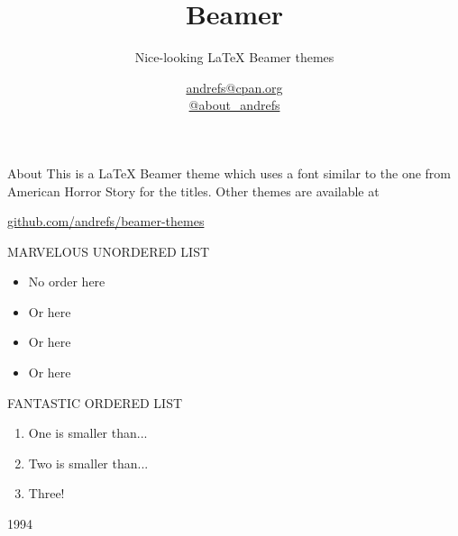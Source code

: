 \documentclass[serif,14pt,color=usenames,dvipsnames]{beamer}
\title{Beamer}
\subtitle{Nice-looking LaTeX Beamer themes}
\author{\href{mailto:andrefs@cpan.org}{andrefs@cpan.org}\\\href{http://twitter.com/about\_andrefs}{@about\_andrefs}}
\institute{Institute, Location}
\begin{document}
\begin{frame}
\maketitle
\end{frame}

\begin{frame}{About}
This is a LaTeX Beamer theme which uses a font similar to the one from
American Horror Story for the titles. Other themes are available at
\begin{center}
\url{github.com/andrefs/beamer-themes}
\end{center}
\end{frame}

\begin{frame}{MARVELOUS UNORDERED LIST}
\begin{itemize}
\item No order here
\item Or here
\item Or here
\item Or here
\end{itemize}
\end{frame}

\begin{frame}{FANTASTIC ORDERED LIST}
\begin{enumerate}
	\item One is smaller than...
	\item Two is smaller than...
	\item Three!
\end{enumerate}
\end{frame}

\begin{frame}{1994}

\end{frame}
\end{document}
